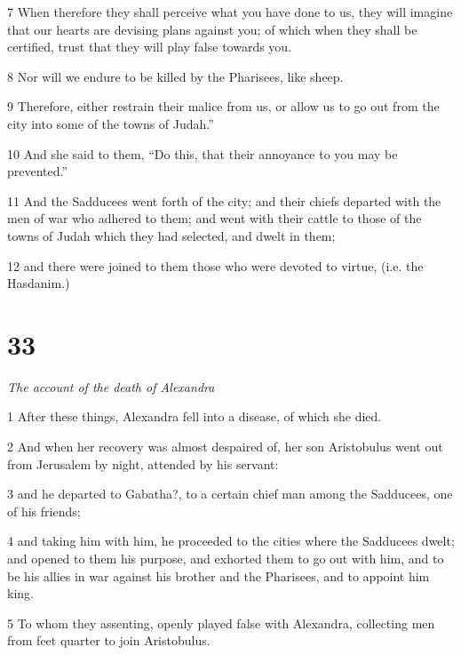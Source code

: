 \par 7 When therefore they shall perceive what you have done to us, they will imagine that our hearts are devising plans against you; of which when they shall be certified, trust that they will play false towards you. 

\par 8 Nor will we endure to be killed by the Pharisees, like sheep. 

\par 9 Therefore, either restrain their malice from us, or allow us to go out from the city into some of the towns of Judah.” 

\par 10 And she said to them, “Do this, that their annoyance to you may be prevented.” 

\par 11 And the Sadducees went forth of the city; and their chiefs departed with the men of war who adhered to them; and went with their cattle to those of the towns of Judah which they had selected, and dwelt in them; 

\par 12 and there were joined to them those who were devoted to virtue, (i.e. the Hasdanim.) 

\chapter{33}

\par \textit{The account of the death of Alexandra}

\par 1 After these things, Alexandra fell into a disease, of which she died. 

\par 2 And when her recovery was almost despaired of, her son Aristobulus went out from Jerusalem by night, attended by his servant: 

\par 3 and he departed to Gabatha?, to a certain chief man among the Sadducees, one of his friends; 

\par 4 and taking him with him, he proceeded to the cities where the Sadducees dwelt; and opened to them his purpose, and exhorted them to go out with him, and to be his allies in war against his brother and the Pharisees, and to appoint him king. 

\par 5 To whom they assenting, openly played false with Alexandra, collecting men from feet quarter to join Aristobulus. 

